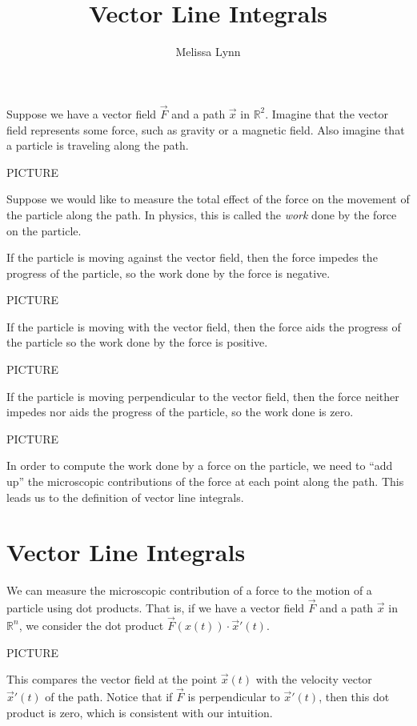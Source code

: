 \documentclass{ximera}
\title{Vector Line Integrals}
\author{Melissa Lynn}
\begin{document}
\begin{abstract}
\end{abstract}
\maketitle

Suppose we have a vector field $\vec{F}$ and a path $\vec{x}$ in $\mathbb{R}^2$. Imagine that the vector field represents some force, such as gravity or a magnetic field. Also imagine that a particle is traveling along the path.

PICTURE

Suppose we would like to measure the total effect of the force on the movement of the particle along the path. In physics, this is called the \emph{work} done by the force on the particle. 

If the particle is moving against the vector field, then the force impedes the progress of the particle, so the work done by the force is negative.

PICTURE

If the particle is moving with the vector field, then the force aids the progress of the particle so the work done by the force is positive.

PICTURE

If the particle is moving perpendicular to the vector field, then the force neither impedes nor aids the progress of the particle, so the work done is zero.

PICTURE

In order to compute the work done by a force on the particle, we need to ``add up'' the microscopic contributions of the force at each point along the path. This leads us to the definition of vector line integrals.

\section*{Vector Line Integrals}

We can measure the microscopic contribution of a force to the motion of a particle using dot products. That is, if we have a vector field $\vec{F}$ and a path $\vec{x}$ in $\mathbb{R}^n$, we consider the dot product $\vec{F}(x(t))\cdot\vec{x}'(t)$.

PICTURE

This compares the vector field at the point $\vec{x}(t)$ with the velocity vector $\vec{x}'(t)$ of the path. Notice that if $\vec{F}$ is perpendicular to $\vec{x}'(t)$, then this dot product is zero, which is consistent with our intuition.
\end{document}
